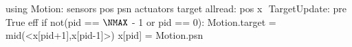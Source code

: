    using Motion:
      sensors pos psn
      actuators target
   allread: pos x $\label{lineformp}$
   TargetUpdate:
      pre True
      eff if not(pid == $\NMAX$ - 1 or pid == 0):
         Motion.target = mid(<x[pid+1],x[pid-1]>)
         x[pid] = Motion.psn